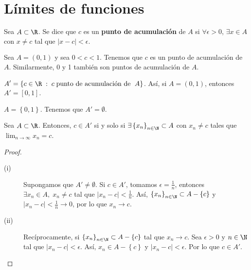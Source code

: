 \chapter{Límites de funciones}

\begin{fdefinition}
\normalfont Sea $\displaystyle A \subset \R $. Se dice que $\displaystyle c $ es un \textbf{punto de acumulación} de $\displaystyle A $ si $\displaystyle \forall \epsilon > 0 $, $\displaystyle \exists x \in A $ con $\displaystyle x \neq c $ tal que $\displaystyle \left|x - c\right| < \epsilon  $.
\end{fdefinition}

\begin{eg}
\normalfont Sea $\displaystyle A = \left(0,1\right) $ y sea $\displaystyle 0 < c < 1 $. Tenemos que $\displaystyle c $ es un punto de acumulación de $\displaystyle A $. Similarmente, 0 y 1 también son puntos de acumulación de $\displaystyle A $.
\end{eg}

\begin{notation}
	\normalfont $\displaystyle A' = \left\{ c \in \R \; : \; c \; \text{punto de acumulación de } \; A\right\}  $. Así, si $\displaystyle A = \left(0,1\right) $, entonces $\displaystyle A' = \left[0,1\right]  $.
\end{notation}
\begin{eg}
	\normalfont $\displaystyle A = \left\{ 0,1\right\}  $. Tenemos que $\displaystyle A' = \emptyset $.
\end{eg}

\begin{ftheorem}[]
	\normalfont Sea $\displaystyle A\subset\R $. Entonces, $\displaystyle c \in A' $ si y solo si $\displaystyle \exists \left\{ x_{n}\right\} _{n\in\N}\subset A $ con $\displaystyle x_{n} \neq c $ tales que $\displaystyle \lim_{n \to \infty}x_{n} = c $.
\end{ftheorem}

\begin{proof}
\begin{description}
\item[(i)] Supongamos que $\displaystyle A' \neq \emptyset $. Si $\displaystyle c \in A' $, tomamos $\displaystyle \epsilon = \frac{1}{n} $, entonces $\displaystyle \exists x_{n} \in A, \; x_{n} \neq c$ tal que $\displaystyle \left|x_{n}-c\right| < \frac{1}{n} $. Así, $\displaystyle \left\{ x_{n}\right\} _{n\in\N}\subset A- \left\{ c\right\}  $ y $\displaystyle \left|x_{n}-c\right| < \frac{1}{n} \to 0 $, por lo que $\displaystyle x_{n} \to c $. 
\item[(ii)] Recíprocamente, si $\displaystyle \left\{ x_{n}\right\} _{n\in\N}\subset A- \left\{ c\right\}  $ tal que $\displaystyle x_{n} \to c $. Sea $\displaystyle \epsilon > 0 $ y $\displaystyle n \in \N $ tal que $\displaystyle \left|x_{n}-c\right| < \epsilon  $. Así, $\displaystyle x_{n} \in A - \left\{ c\right\}  $ y $\displaystyle \left|x_{n}-c\right| < \epsilon  $. Por lo que $\displaystyle c \in A' $.
\end{description}
\end{proof}

